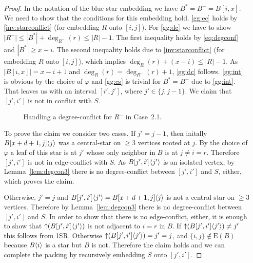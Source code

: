 \documentclass[11pt,a4paper,colorlinks=true,urlcolor=blue,citecolor=red]{article}
\theoremstyle{plain}
\newcommand{\EB}{\mathrm{E}(B)}
\begin{document}
\begin{proof}
  In the notation of the blue-star embedding we have
  $B^*=B^+=B[i,x]$. We need to show that the conditions for this
  embedding hold. \ref{gg:ec} holds by \ref{inv:starconflict} (for
  embedding $R$ onto $[i,j]$). For \ref{gg:dc} we have to show
  $|R^-|\le|B^*|+\deg_{R^-}(r)\le|R|-1$. The first inequality holds by
  \eqref{eq:degconf} and $|B^*|\ge x-i$. The second inequality holds due
  to \ref{inv:starconflict} (for embedding $R$ onto $[i,j]$), which
  implies $\deg_{R}(r)+(x-i)\le|R|-1$. As $|B[i,x]|=x-i+1$ and
  $\deg_{R}(r)=\deg_{R^-}(r)+1$, \ref{gg:dc} follows. \ref{gg:int} is
  obvious by the choice of $\varphi$ and \ref{gg:cs} is trivial for
  $B^*=B^+$ due to \ref{gg:int}. That leaves us with an interval $[i',j']$, where $j'\in\{j,j-1\}$.  We
  claim that $[j',i']$ is not in conflict with $S$.

\begin{figure}[htbp]
    \centering\hfil {}\hfil
    \hfil
    \hfil
    \caption{Handling a degree-conflict for $R^-$ in
      Case~2.1.\label{fig:modgreedygrab}}
  \end{figure}


  To prove the claim we consider two cases. If $j'=j-1$, then initally
  $B{[x+d+1,j]}\langle{j}\rangle$ was a central-star on $\ge 3$ vertices rooted
  at $j$. By the choice of $\varphi$ a leaf of this star is at $j'$
  whose only neighbor in $B$ is at $j\ne i=r$. Therefore $[j',i']$ is
  not in edge-conflict with $S$.  As $B{[j',i']}\langle{j'}\rangle$ is an
  isolated vertex, by Lemma~\ref{lem:degcon3} there is no
  degree-conflict between $[j',i']$ and $S$, either, which proves the
  claim.

  Otherwise, $j'=j$ and $B{[j',i']}\langle{j'}\rangle=B{[x+d+1,j]}\langle{j}\rangle$
  is not a central-star on $\ge 3$ vertices. Therefore by
  Lemma~\ref{lem:degcon3} there is no degree-conflict between $[j',i']$
  and $S$. In order to show that there is no edge-conflict, either, it
  is enough to show that $\mathop{\uparrow}(B{[j',i']}\langle{j'}\rangle)$ is not
  adjacent to $i=r$ in $B$. If $\mathop{\uparrow}(B{[j',i']}\langle{j'}\rangle)\ne j'$
  this follows from 1SR. Otherwise
  $\mathop{\uparrow}(B{[j',i']}\langle{j'}\rangle)=j'=j$, and $\{i,j\}\notin\EB$ because
  $B\langle{i}\rangle$ is a star but $B$ is not. Therefore the claim holds and
  we can complete the packing by recursively embedding $S$ onto
  $[j',i']$.


\end{proof}
\end{document}
